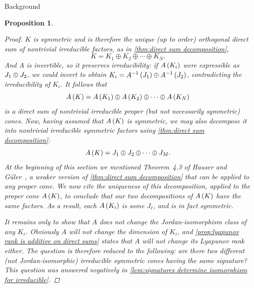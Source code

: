 \documentclass{interact}
\theoremstyle{plain}
\newtheorem{proposition}[theorem]{Proposition}
\theoremstyle{definition}
\theoremstyle{remark}
\begin{document}
\begin{section}{Background}
\begin{proposition}
      \begin{proof}
        $K$ is symmetric and is therefore the unique (up to order)
        orthogonal direct sum of nontrivial irreducible factors, as in
        \cref{thm:direct sum decomposition},
        \begin{equation*}
          K = K_{1} \oplus K_{2} \oplus \cdots \oplus K_{N}.
        \end{equation*}
        And $A$ is invertible, so it preserves irreducibility: if
        $A\left({K_{i}}\right)$ were expressible as ${J_{1}}\oplus{J_{2}}$,
        we could invert to obtain $K_{i} =
        {A^{-1}\left({J_{1}}\right)}\oplus{ A^{-1}  \left({J_{2}}\right) }$,
        contradicting the irreducibility of $K_{i}$. It follows that
        \begin{equation*}
          A\left({K}\right)
          =
          A\left({K_{1}}\right) \oplus A\left({K_{2}}\right) \oplus \cdots \oplus A\left({K_{N}}\right)
        \end{equation*}
        is a direct sum of nontrivial irreducible proper (but not
        necessarily symmetric) cones. Now, having assumed that
        $A\left({K}\right)$ is symmetric, we may also decompose it into
        nontrivial irreducible symmetric factors using
        \cref{thm:direct sum decomposition}:
        \begin{equation*}
          A\left({K}\right) = J_{1} \oplus J_{2} \oplus \cdots \oplus J_{M}.
        \end{equation*}
        At the beginning of this section we mentioned Theorem~4.3 of
        Hauser and Güler~\cite{hauser-guler}, a weaker version of
        \cref{thm:direct sum decomposition} that can be applied to any
        proper cone. We now cite the uniqueness of this decomposition,
        applied to the proper cone $A\left({K}\right)$, to conclude that our two
        decompositions of $A\left({K}\right)$ have the same factors. As a
        result, each $A\left({K_{i}}\right)$ is some $J_{\ell}$, and is in fact
        symmetric.

        It remains only to show that $A$ does not change the
        Jordan-isomorphism class of any $K_{i}$. Obviously $A$ will
        not change the dimension of $K_{i}$, and \cref{prop:lyapunov
          rank is additive on direct sums} states that $A$ will not
        change its Lyapunov rank either. The question is therefore
        reduced to the following: are there two different (not
        Jordan-isomorphic) irreducible symmetric cones having the same
        signature? This question was answered negatively in
        \cref{lem:signatures determine isomorphism for irreducible}.
      \end{proof}
    \end{proposition}
  \end{section}
\end{document}
